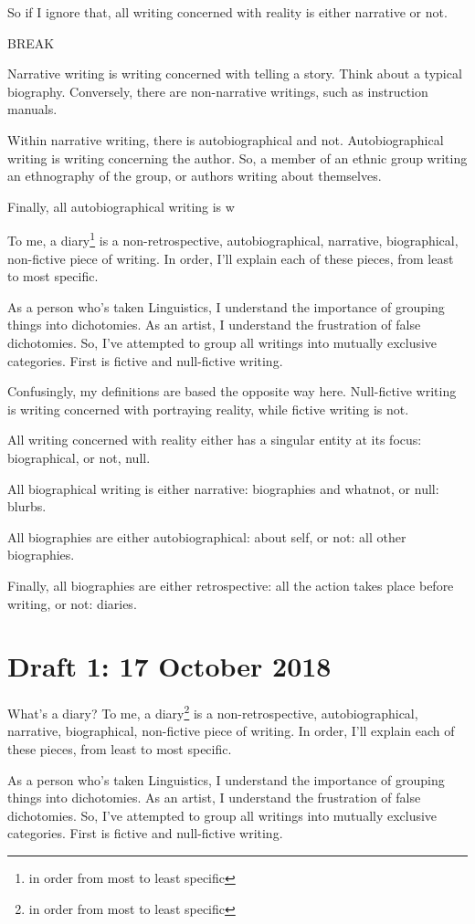 \documentclass[12pt]{article}[titlepage]
\newcommand{\1}{\={a}}
\newcommand{\2}{\={e}}
\newcommand{\3}{\={\i}}
\newcommand{\4}{\=o}
\newcommand{\5}{\=u}
\newcommand{\6}{\={A}}
\renewcommand{\,}{\textsuperscript{,}}
\begin{document}
So if I ignore that, all writing concerned with reality is either narrative or not.

BREAK

Narrative writing is writing concerned with telling a story.
Think about a typical biography.
Conversely, there are non-narrative writings, such as instruction manuals.

Within narrative writing, there is autobiographical and not.
Autobiographical writing is writing concerning the author.
So, a member of an ethnic group writing an ethnography of the group, or authors writing about themselves.

Finally, all autobiographical writing is w

To me, a diary\footnote{in order from most to least specific} is a non-retrospective, autobiographical, narrative, biographical, non-fictive piece of writing.
In order, I'll explain each of these pieces, from least to most specific.

As a person who's taken Linguistics, I understand the importance of grouping things into dichotomies.
As an artist, I understand the frustration of false dichotomies.
So, I've attempted to group all writings into mutually exclusive categories.
First is fictive and null-fictive writing.

Confusingly, my definitions are based the opposite way here.
Null-fictive writing is writing concerned with portraying reality, while fictive writing is not.

All writing concerned with reality either has a singular entity at its focus: biographical, or not, null.

All biographical writing is either narrative: biographies and whatnot, or null: blurbs.

All biographies are either autobiographical: about self, or not: all other biographies.

Finally, all biographies are either retrospective: all the action takes place before writing, or not: diaries.

\section{Draft 1: 17 October 2018}
What's a diary?
To me, a diary\footnote{in order from most to least specific} is a non-retrospective, autobiographical, narrative, biographical, non-fictive piece of writing.
In order, I'll explain each of these pieces, from least to most specific.

As a person who's taken Linguistics, I understand the importance of grouping things into dichotomies.
As an artist, I understand the frustration of false dichotomies.
So, I've attempted to group all writings into mutually exclusive categories.
First is fictive and null-fictive writing.
\end{document}
